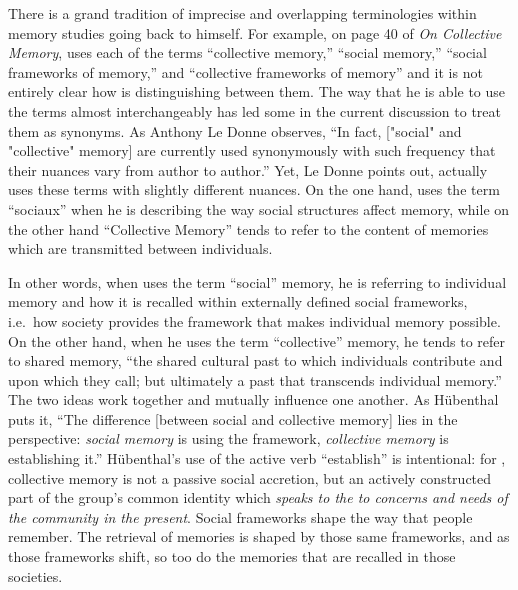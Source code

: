 There is a grand tradition of imprecise and overlapping terminologies
within memory studies going back to \halbwachs himself.
For example, on page 40 of \emph{On Collective Memory},
\halbwachs uses each of the terms ``collective memory,''
``social memory,'' ``social frameworks of memory,'' and ``collective
frameworks of memory'' and it is not entirely clear how
\halbwachs is distinguishing between them. The way that
he is able to use the terms almost interchangeably has led some in the
current discussion to treat them as synonyms. As Anthony Le Donne
observes, ``In fact, {[}"social" and "collective" memory{]} are
currently used synonymously with such frequency that their nuances vary
from author to author.''\autocite[42 n.8]{ledonne2009} Yet, Le Donne
points out, \halbwachs actually uses these terms with
slightly different nuances. On the one hand, \halbwachs
uses the term ``sociaux'' when he is describing the way social
structures affect memory, while on the other hand ``Collective Memory''
tends to refer to the content of memories which are transmitted between
individuals.

In other words, when \halbwachs uses the term ``social''
memory, he is referring to individual memory and how it is recalled
within externally defined social frameworks, i.e.~how society provides
the framework that makes individual memory
possible.\autocite[180]{hubenthal_carstens-hasselbalch2012} On the other
hand, when he uses the term ``collective'' memory, he tends to refer to
shared memory, ``the shared cultural past to which individuals
contribute and upon which they call; but ultimately a past that
transcends individual memory.''\autocites[360]{keith_ec2015}[See
also][180]{hubenthal_carstens-hasselbalch2012} The two ideas work
together and mutually influence one another. As Hübenthal puts it, ``The
difference {[}between social and collective memory{]} lies in the
perspective: \emph{social memory} is using the framework,
\emph{collective memory} is establishing
it.''\autocite[180.]{hubenthal_carstens-hasselbalch2012} Hübenthal's use
of the active verb ``establish'' is intentional: for
\halbwachs, collective memory is not a passive social
accretion, but an actively constructed part of the group's common
identity which \emph{speaks to the to concerns and needs of the
community in the present}. Social frameworks shape the way that people
remember. The retrieval of memories is shaped by those same frameworks,
and as those frameworks shift, so too do the memories that are recalled
in those societies.\autocites[For a modern assessments on the
malleability of human memory and the effects of social networks on the
formation of collective memory,
see][]{coman-etal_pnas2016}{yamashiro-hirst_jarmc2014}{coman-etal_yang-etal2012}

